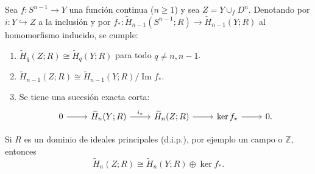 \begin{teorema}
Sea $f \colon S^{n-1} \to Y$ una función continua ($n \geq 1$) y sea $Z = Y \cup_f D^n$. Denotando por $i \colon Y \hookrightarrow Z$ a la inclusión y por $f_* \colon \widetilde{H}_{n-1}(S^{n-1}; R) \to \widetilde{H}_{n-1}(Y; R)$ al homomorfismo inducido, se cumple:
\begin{enumerate}
    \item $\widetilde{H}_q(Z; R) \cong \widetilde{H}_q(Y; R)$ para todo $q \neq n, n - 1$.
    \item $\widetilde{H}_{n-1}(Z; R) \cong \widetilde{H}_{n-1}(Y; R) / \operatorname{Im} f_*$.
    \item Se tiene una sucesión exacta corta:
    \[
    \begin{tikzcd}[column sep=2.4em]
    0 \arrow[r] & \widetilde{H}_n(Y; R) \arrow[r, "i_*"] & \widetilde{H}_n(Z; R) \arrow[r] & \ker f_* \arrow[r] & 0.
    \end{tikzcd}
    \]
\end{enumerate}
\end{teorema}

\begin{nota}
Si $R$ es un dominio de ideales principales (d.i.p.), por ejemplo un campo o $\mathbb{Z}$, entonces
\[
\widetilde{H}_n(Z; R) \cong \widetilde{H}_n(Y; R) \oplus \ker f_*.
\]
\end{nota}

